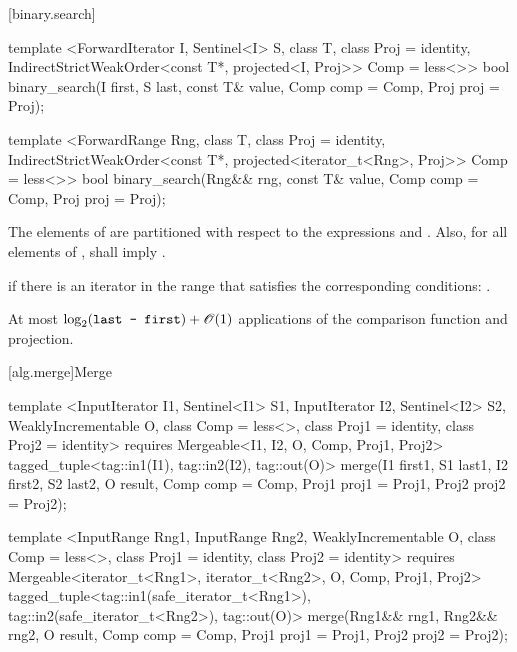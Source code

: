 [binary.search]{}

%
\begin{itemdecl}
template <ForwardIterator I, Sentinel<I> S, class T, class Proj = identity,
    IndirectStrictWeakOrder<const T*, projected<I, Proj>> Comp = less<>>
  bool
    binary_search(I first, S last, const T& value, Comp comp = Comp{},
                  Proj proj = Proj{});

template <ForwardRange Rng, class T, class Proj = identity,
    IndirectStrictWeakOrder<const T*, projected<iterator_t<Rng>, Proj>> Comp = less<>>
  bool
    binary_search(Rng&& rng, const T& value, Comp comp = Comp{},
                  Proj proj = Proj{});
\end{itemdecl}

\begin{itemdescr}
\pnum
\requires
The elements
of
are partitioned with respect to the expressions
and
.
Also, for all elements
of
\tcode{[first, last)},
shall imply
.

\pnum
\returns
{}
if there is an iterator
in the range
that satisfies the corresponding conditions:
.

\pnum
\complexity
At most
$\log_2(\texttt{last - first}) + \mathscr{O}(1)$
applications of the comparison function and projection.
\end{itemdescr}

[alg.merge]{Merge}

%
\begin{itemdecl}
template <InputIterator I1, Sentinel<I1> S1, InputIterator I2, Sentinel<I2> S2,
    WeaklyIncrementable O, class Comp = less<>, class Proj1 = identity,
    class Proj2 = identity>
  requires Mergeable<I1, I2, O, Comp, Proj1, Proj2>
  tagged_tuple<tag::in1(I1), tag::in2(I2), tag::out(O)>
    merge(I1 first1, S1 last1, I2 first2, S2 last2, O result,
          Comp comp = Comp{}, Proj1 proj1 = Proj1{}, Proj2 proj2 = Proj2{});

template <InputRange Rng1, InputRange Rng2, WeaklyIncrementable O, class Comp = less<>,
    class Proj1 = identity, class Proj2 = identity>
  requires Mergeable<iterator_t<Rng1>, iterator_t<Rng2>, O, Comp, Proj1, Proj2>
  tagged_tuple<tag::in1(safe_iterator_t<Rng1>),
               tag::in2(safe_iterator_t<Rng2>),
               tag::out(O)>
    merge(Rng1&& rng1, Rng2&& rng2, O result,
          Comp comp = Comp{}, Proj1 proj1 = Proj1{}, Proj2 proj2 = Proj2{});
\end{itemdecl}

